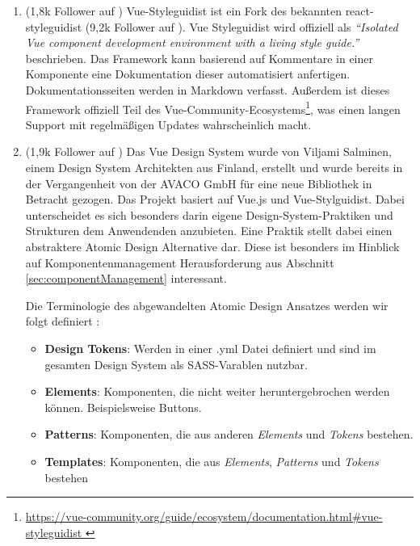 \begin{enumerate}
    \item \textbf{} (1,8k Follower auf \cite{VueStyleguidistGithub})\newline
    Vue-Styleguidist ist ein Fork des bekannten react-styleguidist (9,2k Follower auf \cite{ReactStyleguidistGithub}). Vue Styleguidist wird offiziell als \emph{``Isolated Vue component development environment with a living style guide.''} \citep{VueStyleguidist} beschrieben. Das Framework kann basierend auf Kommentare in einer Komponente eine Dokumentation dieser automatisiert anfertigen. Dokumentationsseiten werden in Markdown verfasst. Außerdem ist dieses Framework offiziell Teil des Vue-Community-Ecosystems\footnote{ \url{https://vue-community.org/guide/ecosystem/documentation.html\#vue-styleguidist } }, was einen langen Support mit regelmäßigen Updates wahrscheinlich macht.
    \item \textbf{} (1,9k Follower auf \cite{VueDesignSystemGithub})\newline
    Das Vue Design System wurde von Viljami Salminen, einem Design System Architekten aus Finland, erstellt und wurde bereits in der Vergangenheit von der AVACO GmbH für eine neue Bibliothek in Betracht gezogen. Das Projekt basiert auf Vue.js und Vue-Stylguidist. Dabei unterscheidet es sich besonders darin eigene Design-System-Praktiken und Strukturen dem Anwendenden anzubieten. Eine Praktik stellt dabei einen abstraktere Atomic Design Alternative dar. Diese ist besonders im Hinblick auf Komponentenmanagement Herausforderung aus Abschnitt \ref{sec:componentManagement} interessant.

    Die Terminologie des abgewandelten Atomic Design Ansatzes werden wir folgt definiert \citep{VueDesignSystemTerminology}:
    \begin{itemize}
        \item \textbf{Design Tokens}: Werden in einer .yml Datei definiert und sind im gesamten Design System als SASS-Varablen nutzbar.
        \item \textbf{Elements}: Komponenten, die nicht weiter heruntergebrochen werden können. Beispielsweise Buttons.
        \item \textbf{Patterns}: Komponenten, die aus anderen \textit{Elements} und \textit{Tokens} bestehen.
        \item \textbf{Templates}: Komponenten, die aus \textit{Elements}, \textit{Patterns} und \textit{Tokens} bestehen
    \end{itemize}


\end{enumerate}

